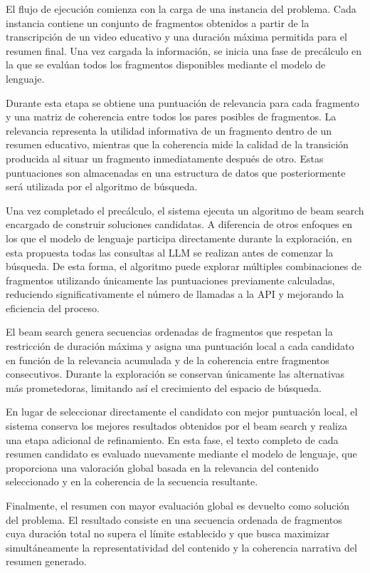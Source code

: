 \documentclass[12pt,a4paper]{article}
\begin{document}
El flujo de ejecución comienza con la carga de una instancia del problema. Cada instancia contiene un conjunto de fragmentos obtenidos a partir de la transcripción de un video educativo y una duración máxima permitida para el resumen final. Una vez cargada la información, se inicia una fase de precálculo en la que se evalúan todos los fragmentos disponibles mediante el modelo de lenguaje.

Durante esta etapa se obtiene una puntuación de relevancia para cada fragmento y una matriz de coherencia entre todos los pares posibles de fragmentos. La relevancia representa la utilidad informativa de un fragmento dentro de un resumen educativo, mientras que la coherencia mide la calidad de la transición producida al situar un fragmento inmediatamente después de otro. Estas puntuaciones son almacenadas en una estructura de datos que posteriormente será utilizada por el algoritmo de búsqueda.

Una vez completado el precálculo, el sistema ejecuta un algoritmo de beam search encargado de construir soluciones candidatas. A diferencia de otros enfoques en los que el modelo de lenguaje participa directamente durante la exploración, en esta propuesta todas las consultas al LLM se realizan antes de comenzar la búsqueda. De esta forma, el algoritmo puede explorar múltiples combinaciones de fragmentos utilizando únicamente las puntuaciones previamente calculadas, reduciendo significativamente el número de llamadas a la API y mejorando la eficiencia del proceso.

El beam search genera secuencias ordenadas de fragmentos que respetan la restricción de duración máxima y asigna una puntuación local a cada candidato en función de la relevancia acumulada y de la coherencia entre fragmentos consecutivos. Durante la exploración se conservan únicamente las alternativas más prometedoras, limitando así el crecimiento del espacio de búsqueda.

En lugar de seleccionar directamente el candidato con mejor puntuación local, el sistema conserva los mejores resultados obtenidos por el beam search y realiza una etapa adicional de refinamiento. En esta fase, el texto completo de cada resumen candidato es evaluado nuevamente mediante el modelo de lenguaje, que proporciona una valoración global basada en la relevancia del contenido seleccionado y en la coherencia de la secuencia resultante.

Finalmente, el resumen con mayor evaluación global es devuelto como solución del problema. El resultado consiste en una secuencia ordenada de fragmentos cuya duración total no supera el límite establecido y que busca maximizar simultáneamente la representatividad del contenido y la coherencia narrativa del resumen generado.
\end{document}
